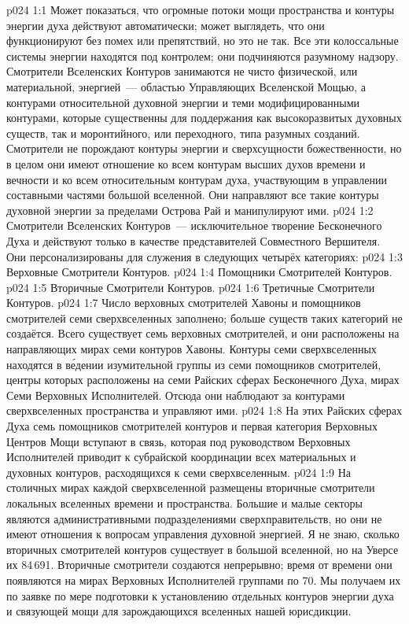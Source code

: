 \vs p024 1:1 Может показаться, что огромные потоки мощи пространства и контуры энергии духа действуют автоматически; может выглядеть, что они функционируют без помех или препятствий, но это не так. Все эти колоссальные системы энергии находятся под контролем; они подчиняются разумному надзору. Смотрители Вселенских Контуров занимаются не чисто физической, или материальной, энергией~--- областью Управляющих Вселенской Мощью, а контурами относительной духовной энергии и теми модифицированными контурами, которые существенны для поддержания как высокоразвитых духовных существ, так и моронтийного, или переходного, типа разумных созданий. Смотрители не порождают контуры энергии и сверхсущности божественности, но в целом они имеют отношение ко всем контурам высших духов времени и вечности и ко всем относительным контурам духа, участвующим в управлении составными частями большой вселенной. Они направляют все такие контуры духовной энергии за пределами Острова Рай и манипулируют ими.
\vs p024 1:2 \pc Смотрители Вселенских Контуров~--- исключительное творение Бесконечного Духа и действуют только в качестве представителей Совместного Вершителя. Они персонализированы для служения в следующих четырёх категориях:
\vs p024 1:3 Верховные Смотрители Контуров.
\vs p024 1:4 Помощники Смотрителей Контуров.
\vs p024 1:5 Вторичные Смотрители Контуров.
\vs p024 1:6 Третичные Смотрители Контуров.
\vs p024 1:7 \pc Число верховных смотрителей Хавоны и помощников смотрителей семи сверхвселенных заполнено; больше существ таких категорий не создаётся. Всего существует семь верховных смотрителей, и они расположены на направляющих мирах семи контуров Хавоны. Контуры семи сверхвселенных находятся в в\'едении изумительной группы из семи помощников смотрителей, центры которых расположены на семи Райских сферах Бесконечного Духа, мирах Семи Верховных Исполнителей. Отсюда они наблюдают за контурами сверхвселенных пространства и управляют ими.
\vs p024 1:8 На этих Райских сферах Духа семь помощников смотрителей контуров и первая категория Верховных Центров Мощи вступают в связь, которая под руководством Верховных Исполнителей приводит к субрайской координации всех материальных и духовных контуров, расходящихся к семи сверхвселенным.
\vs p024 1:9 На столичных мирах каждой сверхвселенной размещены вторичные смотрители локальных вселенных времени и пространства. Большие и малые секторы являются административными подразделениями сверхправительств, но они не имеют отношения к вопросам управления духовной энергией. Я не знаю, сколько вторичных смотрителей контуров существует в большой вселенной, но на Уверсе их 84\,691. Вторичные смотрители создаются непрерывно; время от времени они появляются на мирах Верховных Исполнителей группами по 70. Мы получаем их по заявке по мере подготовки к установлению отдельных контуров энергии духа и связующей мощи для зарождающихся вселенных нашей юрисдикции.
